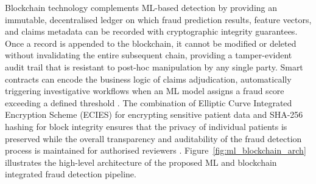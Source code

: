 Blockchain technology complements ML-based detection by providing an immutable, decentralised ledger on which fraud prediction results, feature vectors, and claims metadata can be recorded with cryptographic integrity guarantees. Once a record is appended to the blockchain, it cannot be modified or deleted without invalidating the entire subsequent chain, providing a tamper-evident audit trail that is resistant to post-hoc manipulation by any single party. Smart contracts can encode the business logic of claims adjudication, automatically triggering investigative workflows when an ML model assigns a fraud score exceeding a defined threshold \cite{alhashedi2021}. The combination of Elliptic Curve Integrated Encryption Scheme (ECIES) for encrypting sensitive patient data and SHA-256 hashing for block integrity ensures that the privacy of individual patients is preserved while the overall transparency and auditability of the fraud detection process is maintained for authorised reviewers \cite{amponsah2022}. Figure~\ref{fig:ml_blockchain_arch} illustrates the high-level architecture of the proposed ML and blockchain integrated fraud detection pipeline.

